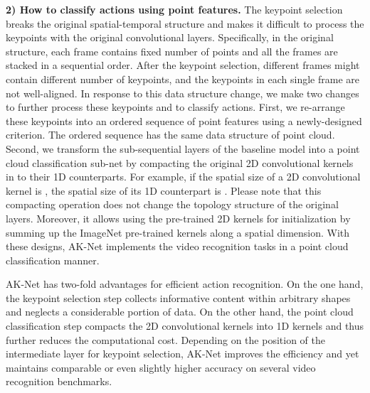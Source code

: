 \documentclass[journal]{IEEEtran}
\begin{document}
\textbf{2) How to classify actions using point features.}
The keypoint selection breaks the original spatial-temporal structure and makes it difficult to process the keypoints with the original convolutional layers. Specifically, in the original structure, each frame contains fixed number of points and all the frames are stacked in a sequential order. After the keypoint selection, different frames might contain different number of keypoints, and the keypoints in each single frame are not well-aligned. In response to this data structure change, we make two changes to further process these keypoints and to classify actions. First, we re-arrange these keypoints into an ordered sequence of point features using a newly-designed criterion. The ordered sequence has the same data structure of point cloud. Second, we transform the sub-sequential layers of the baseline model into a point cloud classification sub-net by compacting the original 2D convolutional kernels in to their 1D counterparts.  
For example, if the spatial size of a 2D convolutional kernel is , the spatial size of its 1D counterpart is . Please note that this compacting operation does not change the topology structure of the original layers. Moreover, it allows using the pre-trained 2D kernels for initialization by summing up the ImageNet \cite{deng2009imagenet} pre-trained kernels along a spatial dimension. 
With these designs, AK-Net implements the video recognition tasks in a point cloud classification manner.

AK-Net has two-fold advantages for efficient action recognition. On the one hand, the keypoint selection step collects informative content within arbitrary shapes and neglects a considerable portion of data. On the other hand, the point cloud classification step compacts the 2D convolutional kernels into 1D kernels and thus further reduces the computational cost. Depending on the position of the intermediate layer for keypoint selection, AK-Net improves the efficiency and yet maintains comparable or even slightly higher accuracy on several video recognition benchmarks. 
\end{document}
